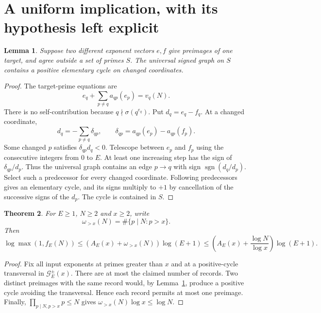\documentclass[11pt]{article}
\newtheorem{theorem}{Theorem}[section]
\newtheorem{lemma}[theorem]{Lemma}
\DeclareMathOperator{\sgn}{sgn}
\begin{document}
\section{A uniform implication, with its hypothesis left explicit}
\begin{lemma}\label{lem:positive}
Suppose two different exponent vectors $e,f$ give preimages of one target, and agree outside a set of primes $S$. The universal signed graph on $S$ contains a positive elementary cycle on changed coordinates.
\end{lemma}
\begin{proof}
The target-prime equations are
\[
 e_q+\sum_{p\ne q}a_{qp}(e_p)=v_q(N).
\]
There is no self-contribution because $q\nmid\sigma(q^{e_q})$. Put $d_q=e_q-f_q$. At a changed coordinate,
\[
 d_q=-\sum_{p\ne q}\delta_{qp},\qquad
 \delta_{qp}=a_{qp}(e_p)-a_{qp}(f_p).
\]
Some changed $p$ satisfies $\delta_{qp}d_q<0$. Telescope between $e_p$ and $f_p$ using the consecutive integers from $0$ to $E$. At least one increasing step has the sign of $\delta_{qp}/d_p$. Thus the universal graph contains an edge $p\to q$ with sign $\sgn(d_q/d_p)$. Select such a predecessor for every changed coordinate. Following predecessors gives an elementary cycle, and its signs multiply to $+1$ by cancellation of the successive signs of the $d_p$. The cycle is contained in $S$.
\end{proof}

\begin{theorem}\label{thm:cutoff}
For $E\ge1$, $N\ge2$ and $x\ge2$, write
\[
 \omega_{>x}(N)=\#\{p\mid N:p>x\}.
\]
Then
\begin{equation}\label{eq:cutoff}
 \boxed{\log\max(1,f_E(N))\le
 \left(A_E(x)+\omega_{>x}(N)\right)\log(E+1)
 \le\left(A_E(x)+\frac{\log N}{\log x}\right)\log(E+1).}
\end{equation}
\end{theorem}
\begin{proof}
Fix all input exponents at primes greater than $x$ and at a positive-cycle transversal in $\mathcal G_E^{\pm}(x)$. There are at most the claimed number of records. Two distinct preimages with the same record would, by Lemma~\ref{lem:positive}, produce a positive cycle avoiding the transversal. Hence each record permits at most one preimage. Finally, $\prod_{p\mid N,p>x}p\le N$ gives $\omega_{>x}(N)\log x\le\log N$.
\end{proof}
\end{document}
